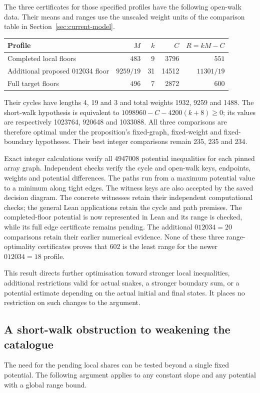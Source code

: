 \documentclass[11pt,a4paper]{article}
\theoremstyle{definition}
\theoremstyle{remark}
\begin{document}
The three certificates for those specified profiles have the following
open-walk data. Their means and ranges use the unscaled weight units of
the comparison table in Section~\ref{sec:current-model}.
\begin{center}\small
\begin{tabular}{l r r r r}
\toprule
Profile & $M$ & $k$ & $C$ & $R=kM-C$\\\midrule
Completed local floors & $483$ & 9 & 3796 & $551$\\
Additional proposed $012034$ floor & $9259/19$ & 31 & 14512 & $11301/19$\\
Full target floors & $496$ & 7 & 2872 & $600$\\
\bottomrule
\end{tabular}
\end{center}
Their cycles have lengths 4, 19 and 3 and total weights 1932, 9259 and 1488.
The short-walk hypothesis is equivalent to
$1098960-C-4200(k+8)\ge0$; its values are respectively 1023764, 920648 and
1033088. All three comparisons are therefore optimal under the proposition's
fixed-graph, fixed-weight and fixed-boundary hypotheses. Their best integer
comparisons remain 235, 235 and 234.

Exact integer calculations verify all 4947008 potential inequalities for
each pinned array graph. Independent checks verify the cycle and open-walk
keys, endpoints, weights and potential differences. The paths run from a
maximum potential value to a minimum along tight edges. The witness keys
are also accepted by the saved decision diagram. The concrete witnesses retain their independent computational checks;
the general Lean applications retain the cycle and path premises. The
completed-floor potential is now represented in Lean and its range is
checked, while its full edge certificate remains pending. The additional
$012034=20$ comparisons retain their earlier numerical evidence. None of
these three range-optimality certificates proves that 602 is the least
range for the newer $012034=18$ profile.

This result directs further optimisation toward stronger local inequalities,
additional restrictions valid for actual snakes, a stronger boundary sum,
or a potential estimate depending on the actual initial and final states.
It places no restriction on such changes to the argument.

\subsection{A short-walk obstruction to weakening the catalogue}\label{sec:short-walk}
The need for the pending local shares can be tested beyond a single fixed potential. The following argument applies to any constant slope and any potential with a global range bound.
\end{document}
